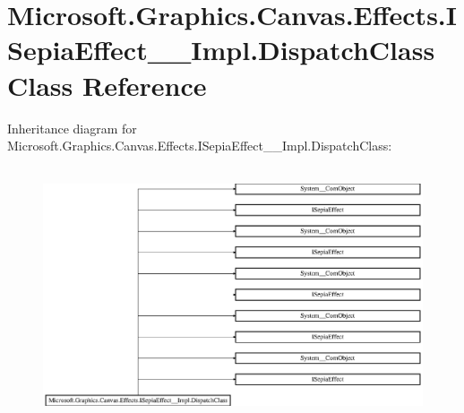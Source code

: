 \hypertarget{class_microsoft_1_1_graphics_1_1_canvas_1_1_effects_1_1_i_sepia_effect_____impl_1_1_dispatch_class}{}\section{Microsoft.\+Graphics.\+Canvas.\+Effects.\+I\+Sepia\+Effect\+\_\+\+\_\+\+Impl.\+Dispatch\+Class Class Reference}
\label{class_microsoft_1_1_graphics_1_1_canvas_1_1_effects_1_1_i_sepia_effect_____impl_1_1_dispatch_class}
Inheritance diagram for Microsoft.\+Graphics.\+Canvas.\+Effects.\+I\+Sepia\+Effect\+\_\+\+\_\+\+Impl.\+Dispatch\+Class\+:\begin{figure}[H]
\begin{center}
\leavevmode
\includegraphics[height=7.512195cm]{class_microsoft_1_1_graphics_1_1_canvas_1_1_effects_1_1_i_sepia_effect_____impl_1_1_dispatch_class}
\end{center}
\end{figure}
